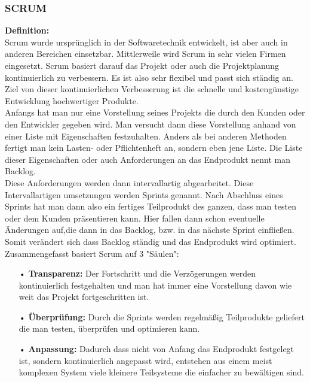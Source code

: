 \subsubsection{SCRUM}


\textbf{Definition:}\\
Scrum wurde ursprünglich in der Softwaretechnik entwickelt, ist aber auch in anderen Bereichen einsetzbar. Mittlerweile wird Scrum in sehr vielen Firmen eingesetzt. Scrum basiert darauf das Projekt oder auch die Projektplanung kontinuierlich zu verbessern. Es ist also sehr flexibel und passt sich ständig an. Ziel von dieser kontinuierlichen Verbesserung ist die schnelle und kostengünstige Entwicklung hochwertiger Produkte. \\
Anfangs hat man nur eine Vorstellung seines Projekts die durch den Kunden oder den Entwickler gegeben wird. Man versucht dann diese Vorstellung anhand von einer Liste mit Eigenschaften festzuhalten. Anders als bei anderen Methoden fertigt man kein Lasten- oder Pflichtenheft an, sondern eben jene Liste. Die Liste dieser Eigenschaften oder auch Anforderungen an das Endprodukt nennt man Backlog.\\
Diese Anforderungen werden dann intervallartig abgearbeitet. Diese Intervallartigen umsetzungen werden Sprints genannt. Nach Abschluss eines Sprints hat man dann also ein fertiges Teilprodukt des ganzen, dass man testen oder dem Kunden präsentieren kann. Hier fallen dann schon eventuelle Änderungen auf,die dann in das Backlog, bzw. in das nächste Sprint einfließen. Somit verändert sich dass Backlog ständig und das Endprodukt wird optimiert.\\
Zusammengefasst basiert Scrum auf 3 "Säulen":

\begin{itemize}
\item[•] \textbf{Transparenz:} Der Fortschritt und die Verzögerungen werden kontinuierlich festgehalten und man hat immer eine Vorstellung davon wie weit das Projekt fortgeschritten ist.
\item[•] \textbf{Überprüfung:} Durch die Sprints werden regelmäßig Teilprodukte geliefert die man testen, überprüfen und optimieren kann. 
\item[•] \textbf{Anpassung:} Dadurch dass nicht von Anfang das Endprodukt festgelegt ist, sondern kontinuierlich angepasst wird, entstehen aus einem meist komplexen System viele kleinere Teilsysteme die einfacher zu bewältigen sind. 
\end{itemize}

